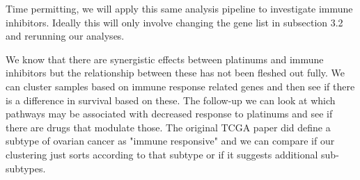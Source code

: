 \documentclass{article}
\begin{document}
Time permitting, we will apply this same analysis pipeline to investigate immune inhibitors. Ideally this will only involve changing the gene list in subsection 3.2 and rerunning our analyses. 

We know that there are synergistic effects between platinums and immune inhibitors but the relationship between these has not been fleshed out fully.  We can cluster samples based on immune response related genes and then see if there is a difference in survival based on these. The follow-up we can look at which pathways may be associated with decreased response to platinums and see if there are drugs that modulate those. The original TCGA paper did define a subtype of ovarian cancer as "immune responsive" and we can compare if our clustering just sorts according to that subtype or if it suggests additional sub-subtypes. 

{}

\end{document}

